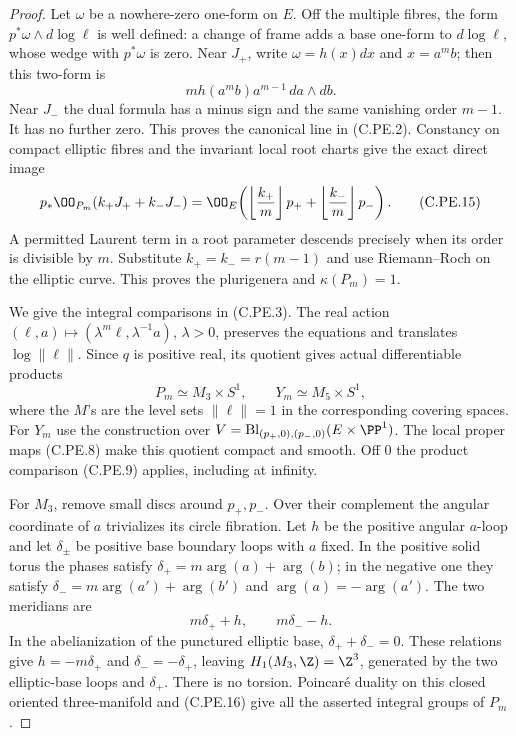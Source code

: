\begin{proof}
Let $\omega$ be a nowhere-zero one-form on $E$.
Off the multiple fibres, the form
$p^*\omega\wedge d\log\ell$ is well defined: a change
of frame adds a base one-form to $d\log\ell$, whose
wedge with $p^*\omega$ is zero. Near $J_+$, write
$\omega=h(x)dx$ and $x=a^m b$; then this two-form is
\[
                m h(a^m b)a^{m-1}\,da\wedge db.         \tag{C.PE.14}
\]
Near $J_-$ the dual formula has a minus sign and the
same vanishing order $m-1$. It has no further zero.
This proves the canonical line in (C.PE.2). Constancy
on compact elliptic fibres and the invariant local
root charts give the exact direct image
\[
 p_*\OO_{P_m}(k_+J_++k_-J_-)
 =\OO_E\!\left(
  \left\lfloor\frac{k_+}m\right\rfloor p_+
 +\left\lfloor\frac{k_-}m\right\rfloor p_-\right).         \tag{C.PE.15}
\]
A permitted Laurent term in a root parameter descends
precisely when its order is divisible by $m$.
Substitute $k_+=k_-=r(m-1)$ and use Riemann--Roch
on the elliptic curve. This proves the plurigenera
and $\kappa(P_m)=1$.

We give the integral comparisons in (C.PE.3). The
real action
$(\ell,a)\mapsto(\lambda^m\ell,\lambda^{-1}a)$,
$\lambda>0$, preserves the equations and translates
$\log\|\ell\|$. Since $q$ is positive real, its
quotient gives actual differentiable products
\[
                   P_m\simeq M_3\times S^1,\qquad
                   Y_m\simeq M_5\times S^1,             \tag{C.PE.16}
\]
where the $M$'s are the level sets $\|\ell\|=1$ in
the corresponding covering spaces. For $Y_m$ use
the construction over
$V=\operatorname{Bl}_{(p_+,0),(p_-,0)}(E\times\PP^1)$.
The local proper maps (C.PE.8) make this quotient
compact and smooth. Off $0$ the product comparison
(C.PE.9) applies, including at infinity.

For $M_3$, remove small discs around $p_+,p_-$.
Over their complement the angular coordinate of
$a$ trivializes its circle fibration. Let $h$ be
the positive angular $a$-loop and let $\delta_\pm$
be positive base boundary loops with $a$ fixed.
In the positive solid torus the phases satisfy
$\delta_+=m\arg(a)+\arg(b)$; in the negative one
they satisfy $\delta_-=m\arg(a')+\arg(b')$ and
$\arg(a)=-\arg(a')$. The two meridians are
\[
                         m\delta_++h,\qquad
                         m\delta_- -h.                 \tag{C.PE.17}
\]
In the abelianization of the punctured elliptic base,
$\delta_++\delta_-=0$. These relations give
$h=-m\delta_+$ and $\delta_-=-\delta_+$, leaving
$H_1(M_3,\Z)=\Z^3$, generated by the two
elliptic-base loops and $\delta_+$. There is no
torsion. Poincar\'e duality on this closed oriented
three-manifold and (C.PE.16) give all the asserted
integral groups of $P_m$.


\end{proof}
